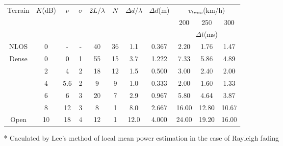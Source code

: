 \begin{table}[!htp]
\renewcommand{\arraystretch}{1}
\centering
\begin{threeparttable}[b]
\begin{tabular}{c|c|c|c|c|c|c|c|c|c|c}
\hline
\multicolumn{1}{c|}{\multirow{3}{*}{Terrain}} & \multicolumn{1}{c|}{\multirow{3}{*}{$K$(dB)}} & \multicolumn{1}{c|}{\multirow{3}{*}{$\nu$}} & \multicolumn{1}{c|}{\multirow{3}{*}{$\sigma$}} & \multicolumn{1}{c|}{\multirow{3}{*}{$2L/\lambda$}} & \multicolumn{1}{c|}{\multirow{3}{*}{$N$}} & \multicolumn{1}{c|}{\multirow{3}{*}{$\Delta d/\lambda$}} & \multicolumn{1}{c|}{\multirow{3}{*}{$\Delta d$(m)}} & \multicolumn{3}{c}{$v_{train}$(km/h)}\\
\cline{9-11}
\multicolumn{1}{c|}{} & \multicolumn{1}{c|}{} & \multicolumn{1}{c|}{} & \multicolumn{1}{c|}{} & \multicolumn{1}{c|}{} & \multicolumn{1}{c|}{} & \multicolumn{1}{c|}{} & \multicolumn{1}{c|}{} & 200 & 250 & 300\\
\cline{9-11}
\multicolumn{1}{c|}{}& \multicolumn{1}{c|}{} & \multicolumn{1}{c|}{} & \multicolumn{1}{c|}{} & \multicolumn{1}{c|}{} & \multicolumn{1}{c|}{} & \multicolumn{1}{c|}{} & \multicolumn{1}{c|}{} & \multicolumn{3}{c}{$\Delta t$(ms)}\\
\cline{1-11}
NLOS\tnote{*}  &  0 &    - & - & 40 & 36 &  1.1 & 0.367 &  2.20 &  1.76 &  1.47\\
\hline
Dense &  0 &   0 & 1 & 55 & 15 &  3.7 & 1.222 &  7.33 &  5.86 &  4.89\\
      &  2 &   4 & 2 & 18 & 12 &  1.5 & 0.500 &  3.00 &  2.40 &  2.00\\
      &  4 & 5.6 & 2 &  9 &  9 &  1.0 & 0.333 &  2.00 &  1.60 &  1.33\\
      &  6 &   6 & 3 & 20 &  7 &  2.9 & 0.967 &  5.80 &  4.64 &  3.87\\
      &  8 &  12 & 3 &  8 &  1 &  8.0 & 2.667 & 16.00 & 12.80 & 10.67\\
Open  & 10 &  18 & 4 & 12 &  1 & 12.0 & 4.000 & 24.00 & 19.20 & 16.00\\
\hline
\end{tabular}
\begin{tablenotes}
\item[*] \small Caculated by Lee's method of local mean power estimation in the case of Rayleigh fading
\end{tablenotes}
\end{threeparttable}
\end{table}

\begin{figure}[!htp]
\centering
\hspace{1in}
\centering
\end{figure}

\nocite{*}
